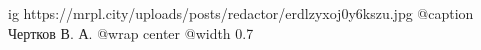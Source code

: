  
 
 
 
 

\ifcmt
  ig https://mrpl.city/uploads/posts/redactor/erdlzyxoj0y6kszu.jpg
	@caption Чертков В. А.
  @wrap center
  @width 0.7
\fi
